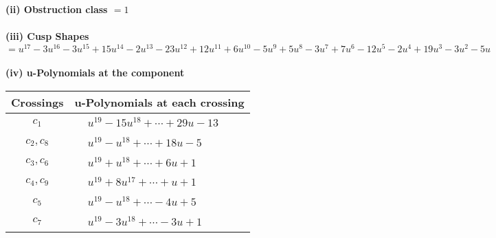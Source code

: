 \documentclass[1p]{elsarticle_modified}
\theoremstyle{definition}
\begin{document}
\flushleft \textbf{(ii) Obstruction class $= 1$}\\~\\
\flushleft \textbf{(iii) Cusp Shapes $= u^{17}-3 u^{16}-3 u^{15}+15 u^{14}-2 u^{13}-23 u^{12}+12 u^{11}+6 u^{10}-5 u^9+5 u^8-3 u^7+7 u^6-12 u^5-2 u^4+19 u^3-3 u^2-5 u$}\\~\\
\newpage\renewcommand{\arraystretch}{1}
\flushleft \textbf{(iv) u-Polynomials at the component}\newline \\
\begin{tabular}{m{50pt}|m{274pt}}
Crossings & \hspace{64pt}u-Polynomials at each crossing \\
\hline $$\begin{aligned}c_{1}\end{aligned}$$&$\begin{aligned}
&u^{19}-15 u^{18}+\cdots+29 u-13
\end{aligned}$\\
\hline $$\begin{aligned}c_{2},c_{8}\end{aligned}$$&$\begin{aligned}
&u^{19}- u^{18}+\cdots+18 u-5
\end{aligned}$\\
\hline $$\begin{aligned}c_{3},c_{6}\end{aligned}$$&$\begin{aligned}
&u^{19}+u^{18}+\cdots+6 u+1
\end{aligned}$\\
\hline $$\begin{aligned}c_{4},c_{9}\end{aligned}$$&$\begin{aligned}
&u^{19}+8 u^{17}+\cdots+u+1
\end{aligned}$\\
\hline $$\begin{aligned}c_{5}\end{aligned}$$&$\begin{aligned}
&u^{19}- u^{18}+\cdots-4 u+5
\end{aligned}$\\
\hline $$\begin{aligned}c_{7}\end{aligned}$$&$\begin{aligned}
&u^{19}-3 u^{18}+\cdots-3 u+1
\end{aligned}$\\

\end{tabular}
\end{document}
